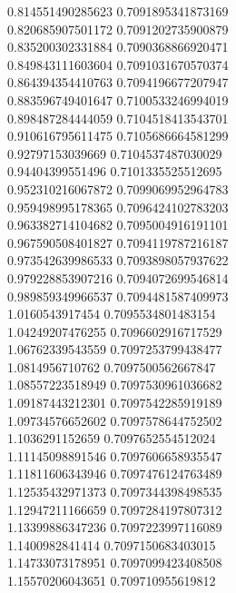 {0.814551490285623 0.7091895341873169 \\
0.820685907501172 0.7091202735900879 \\
0.835200302331884 0.7090368866920471 \\
0.849843111603604 0.7091031670570374 \\
0.864394354410763 0.7094196677207947 \\
0.883596749401647 0.7100533246994019 \\
0.898487284444059 0.7104518413543701 \\
0.910616795611475 0.7105686664581299 \\
0.92797153039669 0.7104537487030029 \\
0.94404399551496 0.7101335525512695 \\
0.952310216067872 0.7099069952964783 \\
0.959498995178365 0.7096424102783203 \\
0.963382714104682 0.7095004916191101 \\
0.967590508401827 0.7094119787216187 \\
0.973542639986533 0.7093898057937622 \\
0.979228853907216 0.7094072699546814 \\
0.989859349966537 0.7094481587409973 \\
1.0160543917454 0.7095534801483154 \\
1.04249207476255 0.7096602916717529 \\
1.06762339543559 0.7097253799438477 \\
1.0814956710762 0.7097500562667847 \\
1.08557223518949 0.7097530961036682 \\
1.09187443212301 0.7097542285919189 \\
1.09734576652602 0.7097578644752502 \\
1.1036291152659 0.7097652554512024 \\
1.11145098891546 0.7097606658935547 \\
1.11811606343946 0.7097476124763489 \\
1.12535432971373 0.7097344398498535 \\
1.12947211166659 0.7097284197807312 \\
1.13399886347236 0.7097223997116089 \\
1.1400982841414 0.7097150683403015 \\
1.14733073178951 0.7097099423408508 \\
1.15570206043651 0.709710955619812 \\
}
